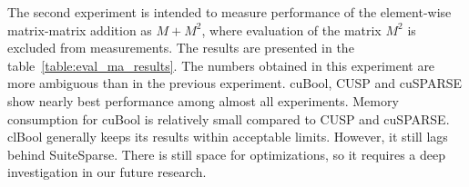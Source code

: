 The second experiment is intended to measure performance of the element-wise matrix-matrix addition as $M + M^2$,
where evaluation of the matrix $M^2$ is excluded from measurements.
The results are presented in the table~\ref{table:eval_ma_results}.
The numbers obtained in this experiment are more ambiguous than in the previous experiment.
cuBool, CUSP and cuSPARSE show nearly best performance among almost all experiments.
Memory consumption for cuBool is relatively small compared to CUSP and cuSPARSE. 
clBool generally keeps its results within acceptable limits.
However, it still lags behind SuiteSparse. 
There is still space for optimizations, 
so it requires a deep investigation in our future research.


